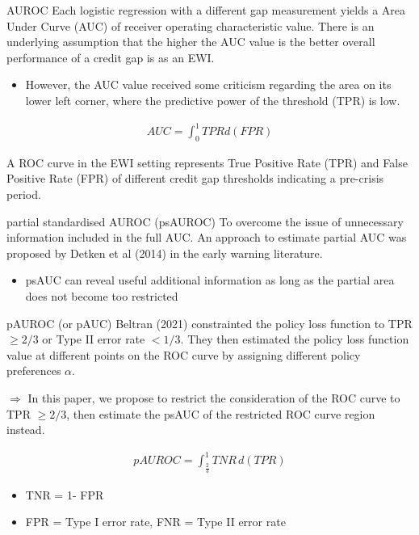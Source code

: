 \documentclass[
  ignorenonframetext,
]{beamer}
\providecommand{\tightlist}{%
  \setlength{\itemsep}{0pt}\setlength{\parskip}{0pt}}
\begin{document}
\begin{frame}{AUROC}
\protect\hypertarget{auroc}{}
Each logistic regression with a different gap measurement yields a Area
Under Curve (AUC) of receiver operating characteristic value. There is
an underlying assumption that the higher the AUC value is the better
overall performance of a credit gap is as an EWI.

\begin{itemize}
\tightlist
\item
  However, the AUC value received some criticism regarding the area on
  its lower left corner, where the predictive power of the threshold
  (TPR) is low.
\end{itemize}

\begin{align*}
AUC = \int_0^1 TPR d(FPR)
\end{align*}

A ROC curve in the EWI setting represents True Positive Rate (TPR) and
False Positive Rate (FPR) of different credit gap thresholds indicating
a pre-crisis period.
\end{frame}

\begin{frame}{partial standardised AUROC (psAUROC)}
\protect\hypertarget{partial-standardised-auroc-psauroc}{}
To overcome the issue of unnecessary information included in the full
AUC. An approach to estimate partial AUC was proposed by Detken et al
(2014) in the early warning literature.

\begin{itemize}
\tightlist
\item
  psAUC can reveal useful additional information as long as the partial
  area does not become too restricted
\end{itemize}
\end{frame}

\begin{frame}{pAUROC (or pAUC)}
\protect\hypertarget{pauroc-or-pauc}{}
Beltran (2021) constrainted the policy loss function to TPR \(\ge 2/3\)
or Type II error rate \(< 1/3\). They then estimated the policy loss
function value at different points on the ROC curve by assigning
different policy preferences \(\alpha\).

\(\Rightarrow\) In this paper, we propose to restrict the consideration
of the ROC curve to TPR \(\ge 2/3\), then estimate the psAUC of the
restricted ROC curve region instead.

\begin{align}
pAUROC = \int_{\frac{2}{3}}^1 TNR \, d(TPR)
\end{align}

\begin{itemize}
\tightlist
\item
  TNR = 1- FPR
\item
  FPR = Type I error rate, FNR = Type II error rate
\end{itemize}
\end{frame}
\end{document}
